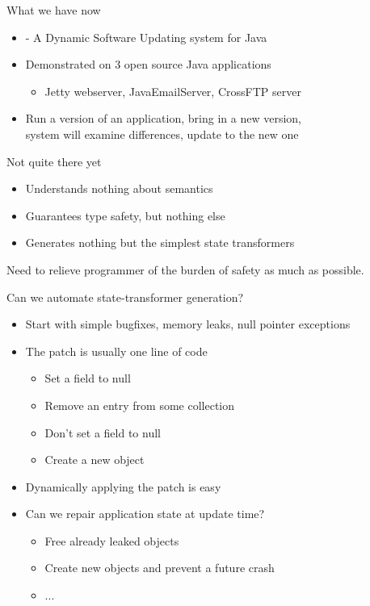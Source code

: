 \begin{frame}{What we have now}%
\begin{itemize}
\item \DSU{} - A Dynamic Software Updating system for Java
\item Demonstrated on 3 open source Java applications
  \begin{itemize}
  \item Jetty webserver, JavaEmailServer, CrossFTP server
  \end{itemize}
\item Run a version of an application, bring in a new version,\\
      \DSU system will examine differences, update to the new one
\end{itemize}
\end{frame}

\begin{frame}{Not quite there yet}%
\begin{itemize}
\item Understands nothing about semantics
\item Guarantees type safety, but nothing else
\item Generates nothing but the simplest state transformers
\end{itemize}

\begin{block}{}
Need to relieve programmer of the burden of safety as much as possible.
\end{block}
\end{frame}

\begin{frame}{Can we automate state-transformer generation?}%
\begin{itemize}
\item Start with simple bugfixes, memory leaks, null pointer exceptions
\item The patch is usually one line of code
  \begin{itemize}
  \item Set a field to null
  \item Remove an entry from some collection
  \item Don't set a field to null
  \item Create a new object
  \end{itemize}
\item Dynamically applying the patch is easy
\item Can we repair application state at update time?
  \begin{itemize}
  \item Free already leaked objects
  \item Create new objects and prevent a future crash
  \item ...
  \end{itemize}
\end{itemize}
\end{frame}


